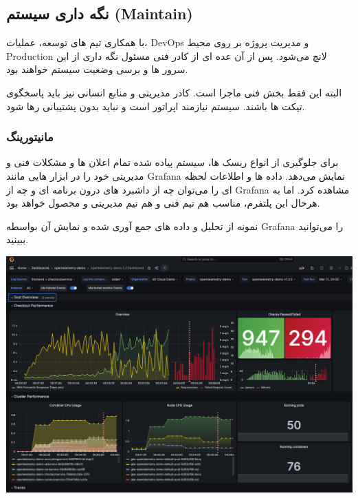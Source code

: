 \subsection{نگه داری سیستم (Maintain)}

با همکاری تیم های توسعه، عملیات، DevOps و مدیریت پروژه بر روی محیط Production لانچ می‌شود.
پس از آن عده ای از کادر فنی مسئول نگه داری از این سرور ها و برسی وضعیت سیستم خواهند بود.

البته این فقط بخش فنی ماجرا است. کادر مدیریتی و منابع انسانی نیز باید پاسخگوی تیکت ها باشند. سیستم نیازمند اپراتور است و نباید بدون پشتیبانی رها شود.


\subsubsection{مانیتورینگ}

برای جلوگیری از انواع ریسک ها، سیستم پیاده شده تمام اعلان ها و مشکلات فنی و مدیریتی خود را در ابزار هایی مانند Grafana نمایش می‌دهد.
داده ها و اطلاعات لحظه ای را می‌توان چه از داشبرد های درون برنامه ای و چه از Grafana مشاهده کرد.
اما به هرحال این پلتفرم، مناسب هم تیم فنی و هم تیم مدیریتی و محصول خواهد بود.

نمونه از تحلیل و داده های جمع آوری شده و نمایش آن بواسطه Grafana را می‌توانید ببینید.

\includegraphics[scale=0.3]{assets/grafana.png}
